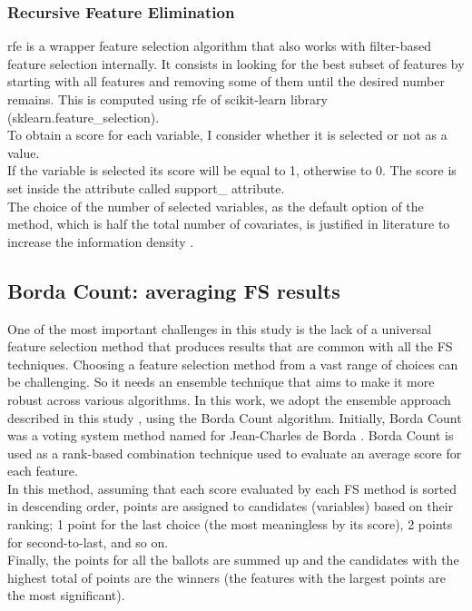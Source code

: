\subsubsection{Recursive Feature Elimination}
\gls{rfe} is a wrapper feature selection algorithm that also works with filter-based feature selection internally.\newline
It consists in looking for the best subset of features by starting with all features and removing some of them until the desired number remains.\newline
This is computed using \acrshort{rfe} of scikit-learn library (sklearn.feature\_selection).\\
To obtain a score for each variable, I consider whether it is selected or not as a value.\\
If the variable is selected its score will be equal to 1, otherwise to 0. The score is set inside the attribute called support\_ attribute.\\
The choice of the number of selected variables, as the default option of the method, which is half the total number of covariates, is justified in literature to increase the information density \cite{escanilla2018recursive}.
\pagebreak
\subsection{Borda Count: averaging FS results}
One of the most important challenges in this study is the lack of a universal feature selection method that produces results that are common with all the FS techniques. Choosing a feature selection method from a vast range of choices can be challenging. \newline
So it needs an ensemble technique that aims to make it more robust across various algorithms. In this work, we adopt the ensemble approach described in this study \cite{sarkar2014robust}, using the Borda Count algorithm. Initially, Borda Count was a voting system method named for Jean-Charles de Borda \cite{borda1784memoire}.\newline
Borda Count is used as a rank-based combination technique used to evaluate an average score for each feature. \\In this method, assuming that each score evaluated by each FS method is sorted in descending order, points are assigned to candidates (variables) based on their ranking; 1 point for the last choice (the most meaningless by its score), 2 points for second-to-last, and so on. \\Finally, the points for all the ballots are summed up and the candidates with the highest total of points are the winners (the features with the largest points are the most significant).
\bigskip
